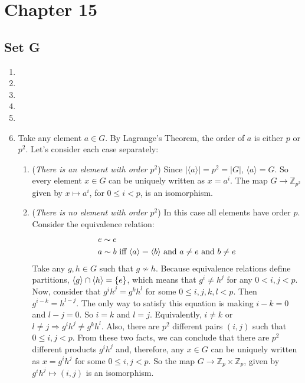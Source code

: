 \section{Chapter 15}
\subsection{Set G}
\begin{enumerate}
    \item 
    \item 
    \item 
    \item 
    \item 
    \item Take any element $a \in G$. By Lagrange's Theorem, the order of $a$ is either $p$ or $p^2$. Let's consider each case separately:
    \begin{enumerate}
        \item (\emph{There is an element with order $p^2$}) Since $|\langle a\rangle| = p^2 = |G|$, $\langle a\rangle = G$. So every element $x \in G$ can be uniquely written as $x = a^i$. The map $G \to \mathbb{Z}_{p^2}$ given by $x \mapsto a^i$, for $0 \leqslant i < p$, is an isomorphism.
        \item (\emph{There is no element with order $p^2$}) In this case all elements have order $p$. Consider the equivalence relation:
        \begin{align*} 
            e \sim e &\\ 
            a \sim b &\ \text{iff $\langle a\rangle = \langle b\rangle$ and $a \ne e$ and $b \ne e$}
        \end{align*}
        Take any $g, h \in G$ such that $g \nsim h$. Because equivalence relations define partitions, $\langle g\rangle \cap \langle h\rangle = \{e\}$, which means that $g^i \ne h^j$ for any $0 < i, j < p$. Now, consider that $g^ih^j = g^kh^l$ for some $0 \leqslant i, j, k, l < p$. Then $g^{i - k} = h^{l - j}$. The only way to satisfy this equation is making $i - k = 0$ and $l - j = 0$. So $i = k$ and $l = j$. Equivalently, $i \ne k$ or $l \ne j \Rightarrow g^ih^j \ne g^kh^l$. Also, there are $p^2$ different pairs $(i, j)$ such that $0 \leqslant i, j < p$. From these two facts, we can conclude that there are $p^2$ different products $g^ih^j$  and, therefore,  any $x \in G$ can be uniquely written as $x = g^ih^j$ for some $0 \leqslant i, j < p$. So the map $G \to \mathbb{Z}_p \times \mathbb{Z}_p$, given by $g^ih^j \mapsto (i, j)$ is an isomorphism.

    \end{enumerate}
\end{enumerate}